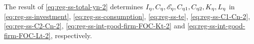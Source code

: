 \documentclass[
thesis.tex
]{subfiles}
\begin{document}

\begin{comment}
	For region $\eta = 1$, substitute \ref{eq:reg-ss-investment}, \ref{eq:reg-ss-C1-Cn-3} and \ref{eq:reg-ss-C2-Cn-3} in \ref{eq:reg-ss-total-yn}:
	\begin{alignat}{2}
		Y_{\eta} &= C_{\eta 1} + C_{\eta 2} + I_{\eta} &\implies \tag{\ref{eq:reg-ss-total-yn}} \\
		Y_{1} &= C_{11} + C_{12} + I_{1} &\implies \nonumber \\
		Y_{1} &= \left( \frac{\omega_{11}}{1 -\omega_{11}} \right)^{1 -\omega_{11}} a_{1} Y_{1}^{\frac{-\varphi}{\sigma}} + \left( \frac{\omega_{11}}{1 -\omega_{11}} \right)^{1 -\omega_{11}} a_{1} Y_{1}^{\frac{-\varphi}{\sigma}} + b_{1} Y_{1} &\implies \nonumber \\
		Y_{1} &= \left[ \left( \frac{a_{1}}{1 - b_{1}} \right) \left( \frac{1}{\omega_{11}^{\omega_{11}} (1 - \omega_{11})^{1 - \omega_{11}}} \right) \right]^{\frac{\sigma}{\sigma + \varphi}} \label{eq:reg-ss-total-y1}
	\end{alignat}
	
	For region $\eta = 2$, substitute \ref{eq:reg-ss-investment}, \ref{eq:reg-ss-C2-Cn-3} and \ref{eq:reg-ss-C1-Cn-3} in \ref{eq:reg-ss-total-yn}:
	\begin{alignat}{2}
		Y_{\eta} &= C_{\eta 1} + C_{\eta 2} + I_{\eta} &\implies \tag{\ref{eq:reg-ss-total-yn}} \\
		Y_{2} &= C_{21} + C_{22} + I_{2} &\implies \nonumber \\
		Y_{2} &= \left( \frac{\omega_{21}}{1 -\omega_{21}} \right)^{1 -\omega_{21}} a_{2} Y_{2}^{\frac{-\varphi}{\sigma}} + \left( \frac{\omega_{21}}{1 -\omega_{21}} \right)^{1 -\omega_{21}} a_{2} Y_{2}^{\frac{-\varphi}{\sigma}} + b_{2} Y_{2} &\implies \nonumber \\
		Y_{2} &= \left[ \left( \frac{a_{2}}{1 - b_{2}} \right) \left( \frac{1}{\omega_{21}^{\omega_{21}} (1 - \omega_{21})^{1 - \omega_{21}}} \right) \right]^{\frac{\sigma}{\sigma + \varphi}} \label{eq:reg-ss-total-y2}
	\end{alignat}
\end{comment}

	The result of \ref{eq:reg-ss-total-yn-2} determines $I_{\eta}, C_{\eta}, \te[],  C_{\eta 1}, C_{\eta 2}, K_{\eta}, L_{\eta}$ in \ref{eq:reg-ss-investment}, \ref{eq:reg-ss-consumption}, \ref{eq:reg-ss-te},  \ref{eq:reg-ss-C1-Cn-2}, \ref{eq:reg-ss-C2-Cn-2}, \ref{eq:reg-ss-int-good-firm-FOC-Kt-2} and \ref{eq:reg-ss-int-good-firm-FOC-Lt-2}, respectively.
\end{document}
